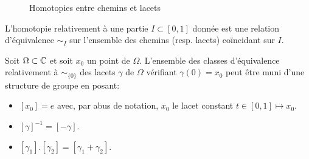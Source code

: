 \begin{figure}[h]
\begin{center}
\begin{tikzpicture}
  
\end{tikzpicture}
\shorthandon{!}\shorthandoff{:}
\end{center}
\caption{Homotopies entre chemins et lacets}
\label{fig:exemple_homotopie}
\end{figure}
L'homotopie relativement à une partie $I \subset [0,1]$ donnée est une relation d'équivalence $\sim_I$ sur l'ensemble des chemins (resp. lacets) coïncidant sur $I$.
\begin{fprop}
\label{prop:groupe_fondamental}
Soit $\Omega \subset \mathbb{C}$ et soit $x_0$ un point de $\Omega$. L'ensemble des classes d'équivalence relativement à $\sim_{\{0\}}$ des lacets $\gamma$ de $\Omega$ vérifiant $\gamma(0)=x_0$ peut être muni d'une structure de groupe en posant:
\begin{itemize}
\item[GF1] $[x_0]=e$ avec, par abus de notation, $x_0$ le lacet constant $t \in[0,1] \mapsto x_0.$
\item[GF2] $[\gamma]^{-1}=[-\gamma].$
\item[GF3] $[\gamma_1].[\gamma_2] = [\gamma_1 + \gamma_2].$
\end{itemize}
\end{fprop}
